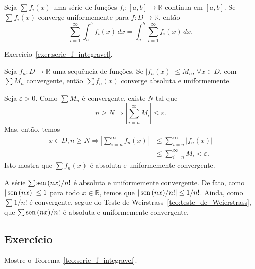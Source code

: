 \begin{teo}\label{teo:serie_f_integravel}
  Seja $\sum f_i(x)$ uma série de funções $f_i:[a, b]\to\mathbb{R}$ contínua em $[a, b]$. Se $\sum f_i(x)$ converge uniformemente para $f:D\to\mathbb{R}$, então
  \begin{equation}
    \sum_{i=1}^\infty \int_a^b f_i(x)\,dx = \int_a^b \sum_{i=1}^\infty f_i(x)\,dx.
  \end{equation}
\end{teo}
\begin{dem}
  Exercício~\ref{exer:serie_f_integravel}.
\end{dem}

\begin{teo}\label{teo:teste_de_Weierstrass}
  Seja $f_n:D\to\mathbb{R}$ uma sequência de funções. Se $|f_n(x)|\leq M_n$, $\forall x\in D$, com $\sum M_n$ convergente, então $\sum f_n(x)$ converge absoluta e uniformemente.
\end{teo}
\begin{dem}
  Seja $\varepsilon>0$. Como $\sum M_n$ é convergente, existe $N$ tal que
  \begin{equation}
    n\geq N \Rightarrow \left|\sum_{i=n}^\infty M_i\right|\leq \varepsilon.
  \end{equation}
Mas, então, temos
\begin{align}
  x\in D, n\geq N \Rightarrow \left|\sum_{i=n}^\infty f_n(x)\right| &\leq \sum_{i=n}^\infty |f_n(x)|\\
  &\leq \sum_{i=n}^\infty M_i < \varepsilon.
\end{align}
Isto mostra que $\sum f_n(x)$ é absoluta e uniformemente convergente.
\end{dem}

\begin{ex}
  A série $\sum \operatorname{sen}\,(nx)/n!$ é absoluta e uniformemente convergente. De fato, como $|\operatorname{sen}\,(nx)|\leq 1$ para todo $x\in \mathbb{R}$, temos que $|\operatorname{sen}\,(nx)/n!|\leq 1/n!$. Ainda, como $\sum 1/n!$ é convergente, segue do Teste de Weirstrass~\ref{teo:teste_de_Weierstrass}, que $\sum \operatorname{sen}\,(nx)/n!$ é absoluta e uniformemente convergente.
\end{ex}

\subsection*{Exercício}

\begin{exer}\label{exer:serie_f_integravel}
  Mostre o Teorema~\ref{teo:serie_f_integravel}.
\end{exer}

